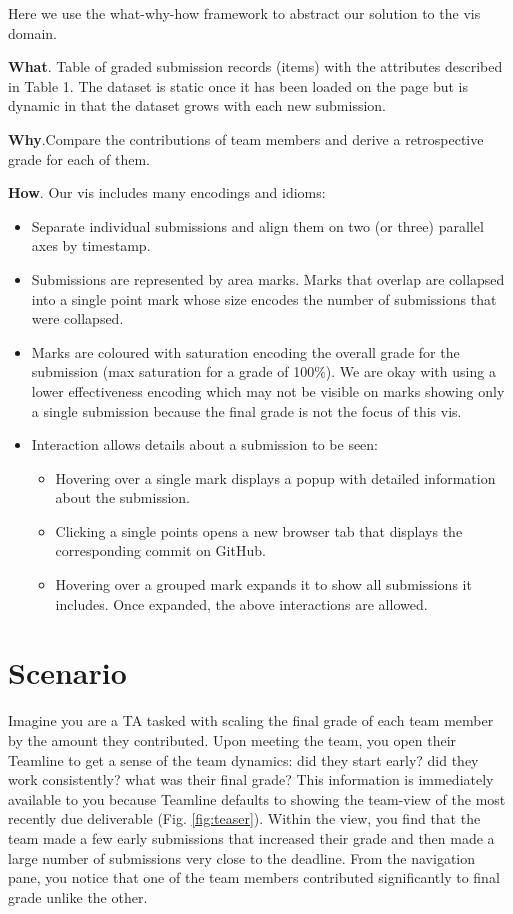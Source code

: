 \documentclass[preprint,journal]{vgtc}       %
\begin{document}
Here we use the what-why-how framework \cite{Munzner:2014} to abstract our solution to the vis domain.

\textbf{What}. Table of graded submission records (items) with the attributes
described in Table 1. The dataset is static once it has been loaded on the page
but is dynamic in that the dataset grows with each new submission.

\textbf{Why}.Compare the contributions of team members and derive a retrospective
grade for each of them.

\textbf{How}. Our vis includes many encodings and idioms:
\begin{itemize}
  \item Separate individual submissions and align them on two (or three)
        parallel axes by timestamp.
  \item Submissions are represented by area marks. Marks that overlap are collapsed into
    a single point mark whose size encodes the number of submissions that were collapsed.
  \item Marks are coloured with saturation encoding the overall grade for the submission (max saturation for a grade of 100\%).
    We are okay with using a lower effectiveness encoding which may not be visible on marks showing only a single submission
    because the final grade is not the focus of this vis.
  \item Interaction allows details about a submission to be seen:
    \begin{itemize}
      \item Hovering over a single mark displays a popup with detailed information about the submission.
      \item Clicking a single points opens a new browser tab that displays the corresponding commit on GitHub.
      \item Hovering over a grouped mark expands it to show all submissions it includes. Once expanded,
        the above interactions are allowed.
    \end{itemize}
\end{itemize}

\section{Scenario}
Imagine you are a TA tasked with scaling the final grade of each team member by
the amount they contributed. Upon meeting the team, you open their Teamline to
get a sense of the team dynamics: did they start early? did they work consistently?
what was their final grade? This information is immediately available to you
because Teamline defaults to showing the team-view of the most recently due deliverable (Fig. \ref{fig:teaser}).
Within the view, you find that the team made a few early submissions that
increased their grade and then made a large number of submissions very close to
the deadline. From the navigation pane, you notice that one of the team members
contributed significantly to final grade unlike the other.
\end{document}
